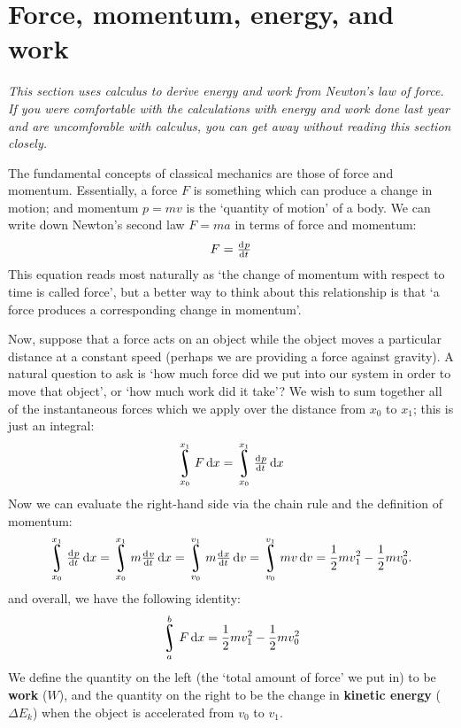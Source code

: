 \documentclass[a4paper]{amsbook}
\theoremstyle{definition}
\numberwithin{exercise}{chapter}
\numberwithin{exercise}{chapter}
\DeclareMathOperator*{\rint}{\scalerel*{\rotatebox{17}{$\!\int\!$}}{\int}}
\begin{document}
\section{Force, momentum, energy, and work}
\emph{This section uses calculus to derive energy and work from Newton's law of force. If you were comfortable with the
calculations with energy and work done last year and are uncomforable with calculus, you can get away without reading this
section closely.}

The fundamental concepts of classical mechanics are those of force and momentum. Essentially, a force $ F $ is something
which can produce a change in motion; and momentum $ p = mv $ is the `quantity of motion' of a body. We can write down Newton's
second law $ F = ma $ in terms of force and momentum:
\begin{equation}
  F = \od{p}{t}
\end{equation}
This equation reads most naturally as `the change of momentum with respect to time is called force', but a better way to think
about this relationship is that `a force produces a corresponding change in momentum'.

Now, suppose that a force acts on an object while the object moves a particular distance at a constant speed (perhaps we are
providing a force against gravity). A natural question to ask is `how much force did we put into our system in order to move
that object', or `how much work did it take'? We wish to sum together all of the instantaneous forces which we apply over the
distance from $ x_0 $ to $ x_1 $; this is just an integral:
\begin{displaymath}
  \rint_{x_0}^{x_1} F \dif{x} = \rint_{x_0}^{x_1} \od{p}{t} \dif{x}
\end{displaymath}
Now we can evaluate the right-hand side via the chain rule and the definition of momentum:
\begin{displaymath}
  \rint_{x_0}^{x_1} \od{p}{t} \dif{x} = \rint_{x_0}^{x_1} m \od{v}{t} \dif{x} = \rint_{v_0}^{v_1} m \od{x}{t} \dif{v}
    = \rint_{v_0}^{v_1} mv \dif{v} = \frac{1}{2}mv_1^2 - \frac{1}{2}mv_0^2.
\end{displaymath}
and overall, we have the following identity:
\begin{displaymath}
  \rint_a^b F \dif{x} = \frac{1}{2}mv_1^2 - \frac{1}{2}mv_0^2
\end{displaymath}
We define the quantity on the left (the `total amount of force' we put in) to be \textbf{work} ($ W $), and the quantity on
the right to be the change in \textbf{kinetic energy} ($ \Delta E_k $) when the object is accelerated from $ v_0 $ to $ v_1 $.
\end{document}
